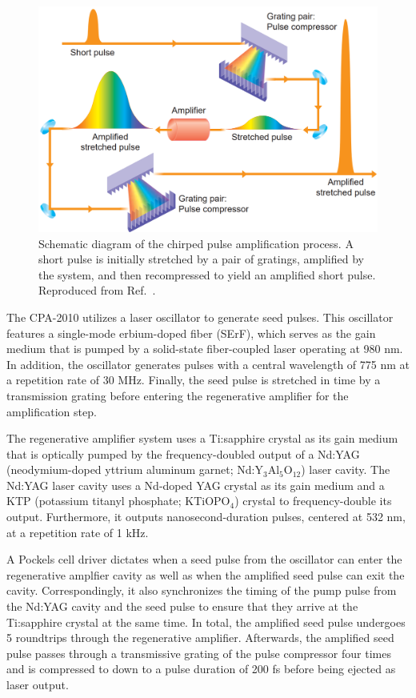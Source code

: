 \begin{figure}[ht]
	\centering
	\includegraphics[scale=0.31]{images/chapter_methods/cpa_process_service}
	\caption{Schematic diagram of the chirped pulse amplification process. A short pulse is initially stretched by a pair of gratings, amplified by the system, and then recompressed to yield an amplified short pulse. Reproduced from Ref.\ \cite{service154}.}
	\label{fig:cpa_process}
\end{figure}

The CPA-2010 utilizes a laser oscillator to generate seed pulses. This oscillator features a single-mode erbium-doped fiber (SErF), which serves as the gain medium that is pumped by a solid-state fiber-coupled laser operating at 980 nm. In addition, the oscillator generates pulses with a central wavelength of 775 nm at a repetition rate of 30 MHz. Finally, the seed pulse is stretched in time by a transmission grating before entering the regenerative amplifier for the amplification step.

The regenerative amplifier system uses a Ti:sapphire crystal as its gain medium that is optically pumped by the frequency-doubled output of a Nd:YAG (neodymium-doped yttrium aluminum garnet; Nd:Y$_3$Al$_5$O$_{12}$) laser cavity. The Nd:YAG laser cavity uses a Nd-doped YAG crystal as its gain medium and a KTP (potassium titanyl phosphate; KTiOPO$_4$) crystal to frequency-double its output. Furthermore, it outputs nanosecond-duration pulses, centered at 532 nm, at a repetition rate of 1 kHz.

A Pockels cell driver dictates when a seed pulse from the oscillator can enter the regenerative amplfier cavity as well as when the amplified seed pulse can exit the cavity. Correspondingly, it also synchronizes the timing of the pump pulse from the Nd:YAG cavity and the seed pulse to ensure that they arrive at the Ti:sapphire crystal at the same time. In total, the amplified seed pulse undergoes 5 roundtrips through the regenerative amplifier. Afterwards, the amplified seed pulse passes through a transmissive grating of the pulse compressor four times and is compressed to down to a pulse duration of 200 fs before being ejected as laser output.

